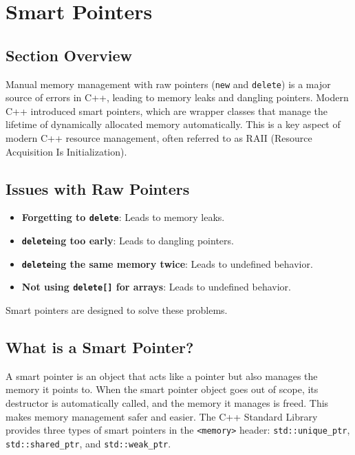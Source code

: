 \section{Smart Pointers}

\subsection{Section Overview}
Manual memory management with raw pointers (\texttt{new} and \texttt{delete}) is a major source of errors in C++, leading to memory leaks and dangling pointers. Modern C++ introduced smart pointers, which are wrapper classes that manage the lifetime of dynamically allocated memory automatically. This is a key aspect of modern C++ resource management, often referred to as RAII (Resource Acquisition Is Initialization).

\subsection{Issues with Raw Pointers}
\begin{itemize}
    \item \textbf{Forgetting to \texttt{delete}}: Leads to memory leaks.
    \item \textbf{\texttt{delete}ing too early}: Leads to dangling pointers.
    \item \textbf{\texttt{delete}ing the same memory twice}: Leads to undefined behavior.
    \item \textbf{Not using \texttt{delete[]} for arrays}: Leads to undefined behavior.
\end{itemize}
Smart pointers are designed to solve these problems.

\subsection{What is a Smart Pointer?}
A smart pointer is an object that acts like a pointer but also manages the memory it points to. When the smart pointer object goes out of scope, its destructor is automatically called, and the memory it manages is freed. This makes memory management safer and easier. The C++ Standard Library provides three types of smart pointers in the \texttt{<memory>} header: \texttt{std::unique\_ptr}, \texttt{std::shared\_ptr}, and \texttt{std::weak\_ptr}.

